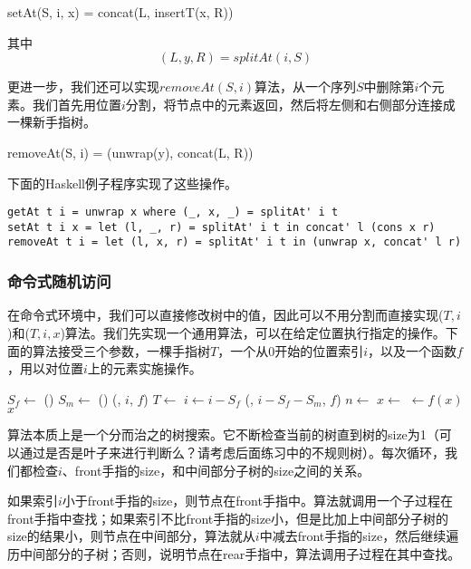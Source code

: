 \documentclass[UTF8]{article}
\begin{document}
\be
setAt(S, i, x) = concat(L, insertT(x, R))
\ee

其中
\[
(L, y, R) = splitAt(i, S)
\]

更进一步，我们还可以实现$removeAt(S, i)$算法，从一个序列$S$中删除第$i$个元素。我们首先用位置$i$分割，将节点中的元素返回，然后将左侧和右侧部分连接成一棵新手指树。

\be
removeAt(S, i) = (unwrap(y), concat(L, R))
\ee

下面的Haskell例子程序实现了这些操作。

\lstset{language=Haskell}
\begin{lstlisting}[style=Haskell]
getAt t i = unwrap x where (_, x, _) = splitAt' i t
setAt t i x = let (l, _, r) = splitAt' i t in concat' l (cons x r)
removeAt t i = let (l, x, r) = splitAt' i t in (unwrap x, concat' l r)
\end{lstlisting}

\subsubsection{命令式随机访问}

在命令式环境中，我们可以直接修改树中的值，因此可以不用分割而直接实现($T, i$)和($T, i, x$)算法。我们先实现一个通用算法，可以在给定位置执行指定的操作。下面的算法接受三个参数，一棵手指树$T$，一个从0开始的位置索引$i$，以及一个函数$f$，用以对位置$i$上的元素实施操作。

\begin{algorithmic}
    \State $S_f \gets $ ()
    \State $S_m \gets $ ()
      \State \Return {}(, $i$, $f$)
      \State $T \gets$ 
      \State $i \gets i - S_f$
    \Else
      \State \Return {}(, $i - S_f - S_m$, $f$)
    \EndIf
  \EndWhile
  \State $n \gets$ 
  \State $x \gets$ 
  \State {} $\gets f(x)$
  \State \Return $x$
\EndFunction
\end{algorithmic}

算法本质上是一个分而治之的树搜索。它不断检查当前的树直到树的size为1（可以通过是否是叶子来进行判断么？请考虑后面练习中的不规则树）。每次循环，我们都检查$i$、front手指的size，和中间部分子树的size之间的关系。

如果索引$i$小于front手指的size，则节点在front手指中。算法就调用一个子过程在front手指中查找；如果索引不比front手指的size小，但是比加上中间部分子树的size的结果小，则节点在中间部分，算法就从$i$中减去front手指的size，然后继续遍历中间部分的子树；否则，说明节点在rear手指中，算法调用子过程在其中查找。
\end{document}
